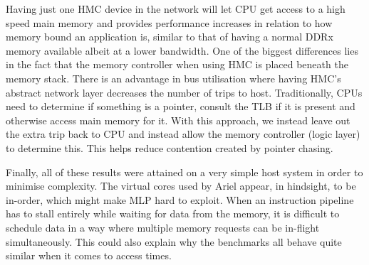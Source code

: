 Having just one HMC device in the network will let CPU get access to a high speed main memory and provides performance increases in relation to how memory bound an application is, similar to that of having a normal DDRx memory available albeit at a lower bandwidth. One of the biggest differences lies in the fact that the memory controller when using HMC is placed beneath the memory stack. There is an advantage in bus utilisation where having HMC's abstract network layer decreases the number of trips to host. Traditionally, CPUs need to determine if something is a pointer, consult the TLB if it is present and otherwise access main memory for it. With this approach, we instead leave out the extra trip back to CPU and instead allow the memory controller (logic layer) to determine this. This helps reduce contention created by pointer chasing.
\bigskip

Finally, all of these results were attained on a very simple host system in order to minimise complexity. The virtual cores used by Ariel appear, in hindsight, to be in-order, which might make MLP hard to exploit. When an instruction pipeline has to stall entirely while waiting for data from the memory, it is difficult to schedule data in a way where multiple memory requests can be in-flight simultaneously. This could also explain why the benchmarks all behave quite similar when it comes to access times.
